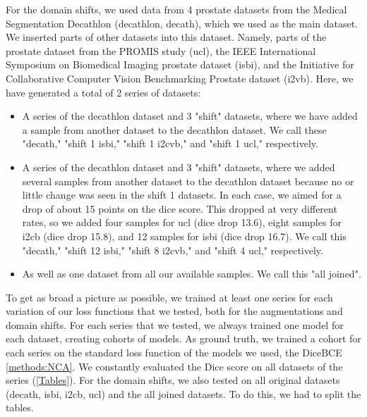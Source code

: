 For the domain shifts, we used data from 4 prostate datasets from the  
Medical Segmentation Decathlon \cite{Antonelli:2022:MedSegmentationDecatlon} (decathlon, decath), which we used as the main dataset. We inserted parts of other datasets into this dataset. Namely, parts of the prostate dataset from the PROMIS study \cite{Ahmed:2017:UCL_PROMIS} (ucl), the
IEEE International Symposium on Biomedical Imaging prostate dataset \cite{Bloch:2015:ISBI_Data, Clark:2013:ISBI_TCIA} (isbi), and the
Initiative for Collaborative Computer Vision Benchmarking Prostate dataset \cite{Lematre:2015:i2cvb} (i2vb). Here, we have generated a total of 2 series of datasets:\begin{itemize}
    \item A series of the decathlon dataset and 3 "shift" datasets, where we have added a sample from another dataset to the decathlon dataset. We call these "decath," "shift 1 isbi," "shift 1 i2cvb," and "shift 1 ucl," respectively.
    \item A series of the decathlon dataset and 3 "shift" datasets, where we added several samples from another dataset to the decathlon dataset because no or little change was seen in the shift 1 datasets. In each case, we aimed for a drop of about 15 points on the dice score. This dropped at very different rates, so we added four samples for ucl (dice drop 13.6), eight samples for i2cb (dice drop 15.8), and 12 samples for isbi (dice drop 16.7).
    We call this "decath," "shift 12 isbi," "shift 8 i2cvb," and "shift 4 ucl," respectively.
    \item As well as one dataset from all our available samples. We call this "all joined".
\end{itemize}

To get as broad a picture as possible, we trained at least one series for each variation of our loss functions that we tested, both for the augmentations and domain shifts. For each series that we tested, we always trained one model for each dataset, creating cohorts of models. As ground truth, we trained a cohort for each series on the standard loss function of the models we used, the DiceBCE \autoref{methods:NCA}. We constantly evaluated the Dice score on all datasets of the series (\autoref{Tables}). For the domain shifts, we also tested on all original datasets (decath, isbi, i2cb, ucl) and the all joined datasets. To do this, we had to split the tables.


